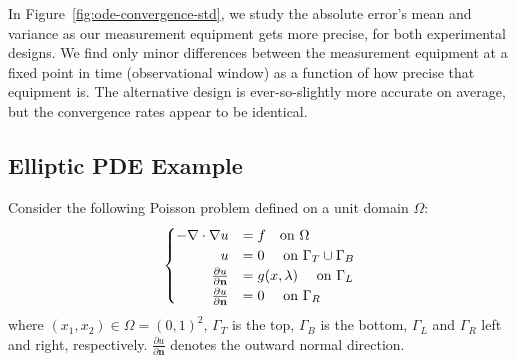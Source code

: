 In Figure~\ref{fig:ode-convergence-std}, we study the absolute error's mean and variance as our measurement equipment gets more precise, for both experimental designs.
We find only minor differences between the measurement equipment at a fixed point in time (observational window) as a function of how precise that equipment is.
The alternative design is ever-so-slightly more accurate on average, but the convergence rates appear to be identical.



\FloatBarrier
\subsection{Elliptic PDE Example}\label{subsec:pde-example}

Consider the following Poisson problem defined on a unit domain $\Omega$:
\begin{equation}\label{eq:pde-equation}
\begin{cases}
\hfill -\nabla \cdot \nabla u &= f \quad\text{on } \Omega \\
\hfill u &= 0 \quad\text{ on } \Gamma_T \cup \Gamma_B \\
\hfill \frac{\partial u}{\partial \mathbf{n}} &= g(x,\param) \quad\text{ on } \Gamma_L \\
\hfill \frac{\partial u}{\partial \mathbf{n}} &= 0 \quad\text{ on } \Gamma_R
\end{cases}
\end{equation}
where $(x_1, x_2) \in \Omega = (0,1)^2$, $\Gamma_T$ is the top, $\Gamma_B$ is the bottom, $\Gamma_L$ and $\Gamma_R$ left and right, respectively.
$\frac{\partial u}{\partial \mathbf{n}}$ denotes the outward normal direction.

